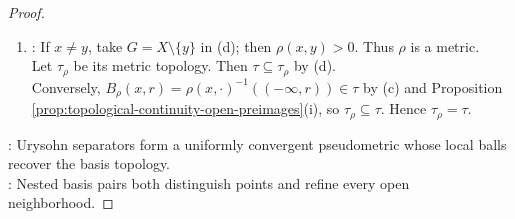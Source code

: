 \begin{theorem}
\begin{proof}
\begin{enumerate}[label=\roman*.]
\begin{enumerate}[label=(\alph*)]
If $y\notin U_m$, then $f_{n,m}(x)=0$ and $f_{n,m}(y)=1$, so $\rho(x,y)\geq2^{-(n+m)}$. Hence $B_\rho(x,2^{-(n+m+1)})\subseteq U_m\subseteq G$.
\item {}: If $x\neq y$, take $G=X\setminus\{y\}$ in (d); then $\rho(x,y)>0$. Thus $\rho$ is a metric.\\
Let $\tau_\rho$ be its metric topology. Then $\tau\subseteq\tau_\rho$ by (d).\\
Conversely, $B_\rho(x,r)=\rho(x,\cdot)^{-1}((-\infty,r))\in\tau$ by (c) and Proposition \ref{prop:topological-continuity-open-preimages}(i), so $\tau_\rho\subseteq\tau$. Hence $\tau_\rho=\tau$.
\end{enumerate}
\end{enumerate}
: Urysohn separators form a uniformly convergent pseudometric whose local balls recover the basis topology.\\
: Nested basis pairs both distinguish points and refine every open neighborhood.
\end{proof}
\end{theorem}
